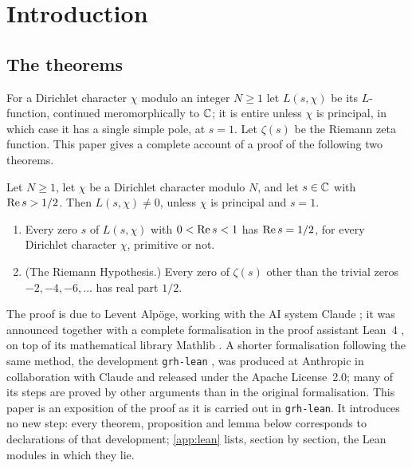 \section{Introduction}\label{sec:intro}

\subsection{The theorems}\label{ss:intro-theorems}
For a Dirichlet character $\chi$ modulo an integer $N\ge1$ let $L(s,\chi)$ be its $L$-function,
continued meromorphically to $\mathbb{C}$; it is entire unless $\chi$ is principal, in which case it has a
single simple pole, at $s=1$. Let $\zeta(s)$ be the Riemann zeta function. This paper gives a complete
account of a proof of the following two theorems.

\begin{theorem}\label{thm:main-grh}
Let $N\ge1$, let $\chi$ be a Dirichlet character modulo $N$, and let $s\in\mathbb{C}$ with $\operatorname{Re} s>1/2$.
Then $L(s,\chi)\neq0$, unless $\chi$ is principal and $s=1$.
\end{theorem}

\begin{theorem}\label{thm:main-rh}
\begin{enumerate}[label=\textup{(\alph*)}]
\item Every zero $s$ of $L(s,\chi)$ with $0<\operatorname{Re} s<1$ has $\operatorname{Re} s=1/2$, for every Dirichlet character
$\chi$, primitive or not.
\item \textup{(The Riemann Hypothesis.)} Every zero of $\zeta(s)$ other than the trivial zeros
$-2,-4,-6,\dots$ has real part $1/2$.
\end{enumerate}
\end{theorem}

The proof is due to Levent Alp\"oge, working with the AI system Claude \cite{Alpoge2026}; it was
announced together with a complete formalisation in the proof assistant Lean~4
\cite{deMouraUllrich2021}, on top of its mathematical library Mathlib \cite{mathlib2020}. A shorter
formalisation following the same method, the development \texttt{grh-lean} \cite{GRHLean2026}, was
produced at Anthropic in collaboration with Claude and released under the Apache License~2.0; many of
its steps are proved by other arguments than in the original formalisation. This paper is an exposition of the proof as it is carried out in \texttt{grh-lean}. It
introduces no new step: every theorem, proposition and lemma below corresponds to declarations of
that development; \cref{app:lean} lists, section by section, the Lean modules in which they lie.

